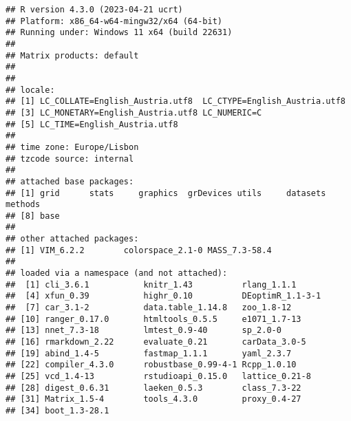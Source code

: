 \documentclass[
]{article}
\begin{document}
\begin{verbatim}
## R version 4.3.0 (2023-04-21 ucrt)
## Platform: x86_64-w64-mingw32/x64 (64-bit)
## Running under: Windows 11 x64 (build 22631)
## 
## Matrix products: default
## 
## 
## locale:
## [1] LC_COLLATE=English_Austria.utf8  LC_CTYPE=English_Austria.utf8   
## [3] LC_MONETARY=English_Austria.utf8 LC_NUMERIC=C                    
## [5] LC_TIME=English_Austria.utf8    
## 
## time zone: Europe/Lisbon
## tzcode source: internal
## 
## attached base packages:
## [1] grid      stats     graphics  grDevices utils     datasets  methods  
## [8] base     
## 
## other attached packages:
## [1] VIM_6.2.2        colorspace_2.1-0 MASS_7.3-58.4   
## 
## loaded via a namespace (and not attached):
##  [1] cli_3.6.1           knitr_1.43          rlang_1.1.1        
##  [4] xfun_0.39           highr_0.10          DEoptimR_1.1-3-1   
##  [7] car_3.1-2           data.table_1.14.8   zoo_1.8-12         
## [10] ranger_0.17.0       htmltools_0.5.5     e1071_1.7-13       
## [13] nnet_7.3-18         lmtest_0.9-40       sp_2.0-0           
## [16] rmarkdown_2.22      evaluate_0.21       carData_3.0-5      
## [19] abind_1.4-5         fastmap_1.1.1       yaml_2.3.7         
## [22] compiler_4.3.0      robustbase_0.99-4-1 Rcpp_1.0.10        
## [25] vcd_1.4-13          rstudioapi_0.15.0   lattice_0.21-8     
## [28] digest_0.6.31       laeken_0.5.3        class_7.3-22       
## [31] Matrix_1.5-4        tools_4.3.0         proxy_0.4-27       
## [34] boot_1.3-28.1
\end{verbatim}
\end{document}
